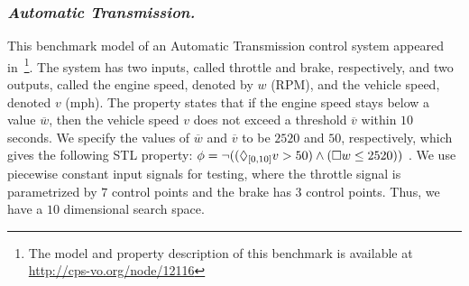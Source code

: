 


\subsubsection*{{\em Automatic Transmission.}} \label{sec:autotrans}
This benchmark model of an Automatic Transmission control
system appeared in~\cite{DBLP:conf/cpsweek/HoxhaAF14}\footnote{The model
and property description of this benchmark is available at \url{http://cps-vo.org/node/12116}}.  The system has
two inputs, called throttle and brake, respectively, and two
outputs, called the engine speed, denoted by $w$ (RPM), and the vehicle
speed, denoted $v$ (mph). The property states that if the engine speed stays below a value
$\overline{w}$, then the vehicle speed $v$ does not exceed a threshold
$\overline{v}$ within $10$ seconds.  We specify the values of $\overline{w}$ and
$\overline{v}$ to be $2520$ and $50$, respectively, which gives the
following STL property: $\phi=\neg ((\Diamond_{[0,10]}v>50)\wedge(\Box w\leq
2520) )$ \cite{DBLP:conf/cpsweek/HoxhaAF14}. We use piecewise constant input
signals for testing, where the throttle signal is parametrized by $7$
control points and the brake has $3$ control points. Thus, we have a
$10$ dimensional search space.



